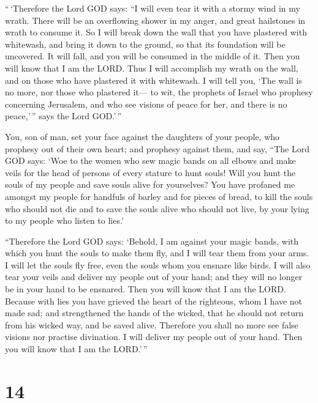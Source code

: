  ``\,`Therefore the Lord GOD says: ``I will even tear it
with a stormy wind in my wrath. There will be an overflowing shower in
my anger, and great hailstones in wrath to consume it. 
So I will break down the wall that you have plastered with whitewash,
and bring it down to the ground, so that its foundation will be
uncovered. It will fall, and you will be consumed in the middle of it.
Then you will know that I am the LORD.  Thus I will
accomplish my wrath on the wall, and on those who have plastered it with
whitewash. I will tell you, `The wall is no more, nor those who
plastered it---  to wit, the prophets of Israel who
prophesy concerning Jerusalem, and who see visions of peace for her, and
there is no peace,'\,'' says the Lord GOD.'\,''

 You, son of man, set your face against the daughters of
your people, who prophesy out of their own heart; and prophesy against
them,  and say, ``The Lord GOD says: `Woe to the women
who sew magic bands on all elbows and make veils for the head of persons
of every stature to hunt souls! Will you hunt the souls of my people and
save souls alive for yourselves?  You have profaned me
amongst my people for handfuls of barley and for pieces of bread, to
kill the souls who should not die and to save the souls alive who should
not live, by your lying to my people who listen to lies.'

 ``Therefore the Lord GOD says: `Behold, I am against
your magic bands, with which you hunt the souls to make them fly, and I
will tear them from your arms. I will let the souls fly free, even the
souls whom you ensnare like birds.  I will also tear your
veils and deliver my people out of your hand; and they will no longer be
in your hand to be ensnared. Then you will know that I am the LORD.
 Because with lies you have grieved the heart of the
righteous, whom I have not made sad; and strengthened the hands of the
wicked, that he should not return from his wicked way, and be saved
alive.  Therefore you shall no more see false visions nor
practise divination. I will deliver my people out of your hand. Then you
will know that I am the LORD.'\,''

\hypertarget{section-12}{%
\section{14}\label{section-12}}

